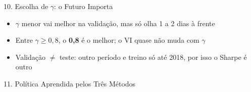 \documentclass[aspectratio=169,10pt,t]{beamer}
\begin{document}
\begin{frame}{10. Escolha de $\gamma$: o Futuro Importa}
  \small
  \begin{itemize}\setlength{\itemsep}{2pt}
    \item $\gamma$ menor vai melhor na validação, mas só olha 1 a 2 dias à frente
    \item Entre $\gamma \ge 0{,}8$, o \textbf{0,8} é o melhor; o VI quase não muda com $\gamma$
    \item Validação $\neq$ teste: outro período e treino só até 2018, por isso o Sharpe é outro
  \end{itemize}

\end{frame}

\begin{frame}{11. Política Aprendida pelos Três Métodos}


\end{frame}
\end{document}

